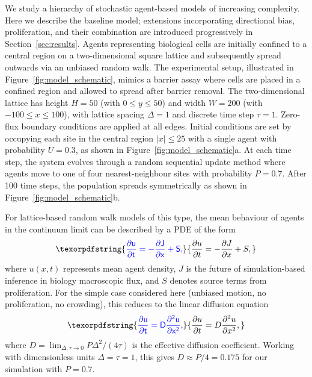 \documentclass{article}
\providecommand{\DIFaddtex}[1]{{\protect\color{blue} \sf #1}} %
\providecommand{\DIFdeltex}[1]{{\protect\color{red} \scriptsize #1}} %
\providecommand{\DIFaddbegin}{} %
\providecommand{\DIFaddend}{} %
\providecommand{\DIFdelbegin}{} %
\providecommand{\DIFdelend}{} %
\providecommand{\DIFadd}[1]{\texorpdfstring{\DIFaddtex{#1}}{#1}} %
\providecommand{\DIFdel}[1]{\texorpdfstring{\DIFdeltex{#1}}{}} %
\newcommand{\DIFscaledelfig}{0.5}
\newlength{\DIFdelgraphicswidth} %
\newlength{\DIFdelgraphicsheight} %
\newcommand{\DIFaddincludegraphics}[2][]{{\color{blue}\fbox{\DIFOincludegraphics[#1]{#2}}}} %
\newcommand{\DIFdelincludegraphics}[2][]{%
\sbox{\DIFdelgraphicsbox}{\DIFOincludegraphics[#1]{#2}}%
\settoboxwidth{\DIFdelgraphicswidth}{\DIFdelgraphicsbox} %
\settoboxtotalheight{\DIFdelgraphicsheight}{\DIFdelgraphicsbox} %
\scalebox{\DIFscaledelfig}{%
\parbox[b]{\DIFdelgraphicswidth}{\usebox{\DIFdelgraphicsbox}\\[-\baselineskip] \rule{\DIFdelgraphicswidth}{0em}}\llap{\resizebox{\DIFdelgraphicswidth}{\DIFdelgraphicsheight}{%
\setlength{\unitlength}{\DIFdelgraphicswidth}%
\begin{picture}(1,1)%
\thicklines\linethickness{2pt} %
{\color[rgb]{1,0,0}\put(0,0){\framebox(1,1){}}}%
{\color[rgb]{1,0,0}\put(0,0){\line( 1,1){1}}}%
{\color[rgb]{1,0,0}\put(0,1){\line(1,-1){1}}}%
\end{picture}%
}\hspace*{3pt}}} %
} %
\DeclareRobustCommand{\DIFaddbegin}{\DIFOaddbegin \let\includegraphics\DIFaddincludegraphics} %
\DeclareRobustCommand{\DIFaddend}{\DIFOaddend \let\includegraphics\DIFOincludegraphics} %
\DeclareRobustCommand{\DIFdelbegin}{\DIFOdelbegin \let\includegraphics\DIFdelincludegraphics} %
\DeclareRobustCommand{\DIFdelend}{\DIFOaddend \let\includegraphics\DIFOincludegraphics} %
\begin{document}
\DIFadd{We study a hierarchy of stochastic agent-based models of increasing complexity. Here we describe the baseline model; extensions incorporating directional bias, proliferation, and their combination are introduced progressively in Section~\ref{sec:results}. Agents representing biological cells are initially confined to a central region on a two-dimensional square lattice and subsequently spread outwards via an unbiased random walk. The experimental setup, illustrated in Figure~\ref{fig:model_schematic}, mimics a barrier assay where cells are placed in a confined region and allowed to spread after barrier removal. The two-dimensional lattice has height $H=50$ (with $0\leq y \leq 50$) and width $W=200$ (with $-100 \leq x \leq 100$), with lattice spacing $\Delta=1$ and discrete time step $\tau=1$. Zero-flux boundary conditions are applied at all edges. Initial conditions are set by occupying each site in the central region $|x| \leq 25$ with a single agent with probability $U=0.3$, as shown in Figure~\ref{fig:model_schematic}a. At each time step, the system evolves through a random sequential update method where agents move to one of four nearest-neighbour sites with probability $P=0.7$. After 100 time steps, the population spreads symmetrically as shown in Figure~\ref{fig:model_schematic}b.
}

\DIFadd{For lattice-based random walk models of this type, the mean behaviour of agents in the continuum limit can be described by a PDE of the form \citep{Codling2008,Simpson2025.05.25.656057,Plank2025}
}\begin{equation}
	\DIFadd{\frac{\partial u}{\partial t} = -\frac{\partial J}{\partial x} + S,
}\end{equation}
\DIFadd{where $u(x,t)$ represents mean agent density, $J$ is }\DIFaddend the \DIFdelbegin \DIFdel{future of simulation-based inference in biology}\DIFdelend \DIFaddbegin \DIFadd{macroscopic flux, and $S$ denotes source terms from proliferation. For the simple case considered here (unbiased motion, no proliferation, no crowding), this reduces to the linear diffusion equation
}\begin{equation}
	\DIFadd{\frac{\partial u}{\partial t} = D\frac{\partial^2 u}{\partial x^2},
}\end{equation}
\DIFadd{where $D = \lim_{\Delta,\tau \to 0} P\Delta^2/(4\tau)$ is the effective diffusion coefficient. Working with dimensionless units $\Delta=\tau=1$, this gives $D \approx P/4=0.175$ for our simulation with $P=0.7$}\DIFaddend .
\end{document}
